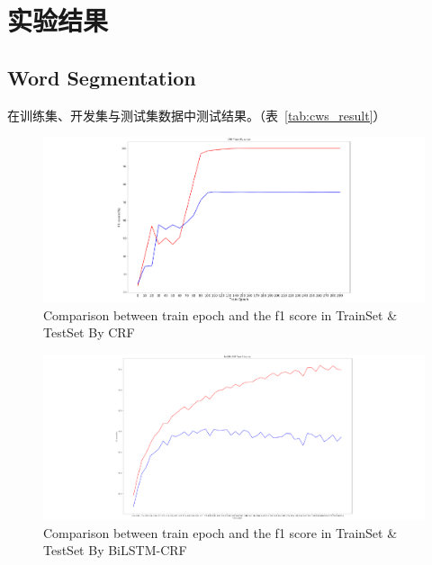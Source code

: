 \section{实验结果}
\label{sec:result}

\subsection*{Word Segmentation}

在训练集、开发集与测试集数据中测试结果。（表~\ref{tab:cws_result}）



\begin{figure}[ht]
    \begin{center}
    \includegraphics[width=1\textwidth]{figures/cws1.pdf}
    \end{center}
    \caption{Comparison between train epoch and the f1 score in TrainSet \& TestSet By CRF}
    \label{fig:cws1}
\end{figure}

\begin{figure}[ht]
    \begin{center}
    \includegraphics[width=1\textwidth]{figures/cws2.pdf}
    \end{center}
    \caption{Comparison between train epoch and the f1 score in TrainSet \& TestSet By BiLSTM-CRF}
    \label{fig:cws2}
\end{figure}

